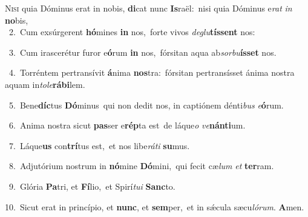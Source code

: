 \lettrine{\initial\textcolor{\initialcolor}{N}}{isi} quia Dóminus erat in nobis, \textbf{di}\-cat nunc \textbf{Is}\-raël:~\star nisi quia Dóminus e\textit{rat} \textit{in} \textbf{no}\-bis,\\
{\numbfont\textcolor{\numbcolor}{~2.}}~Cum exsúrgerent \textbf{hó}\-mines \textbf{in} nos,~\star forte vivos \textit{de}\-\textit{glu}\textbf{tís}\textbf{sent} nos:\par
{\numbfont\textcolor{\numbcolor}{~3.}}~Cum irascerétur furor e\-\textbf{ó}\-rum \textbf{in} nos,~\star fórsitan aqua ab\-\textit{sor}\-\textit{bu}\textbf{ís}\textbf{set} nos.\par
{\numbfont\textcolor{\numbcolor}{~4.}}~Torréntem pertransívit \textbf{á}\-nima \textbf{nos}\-tra:~\star fórsitan pertransísset ánima nostra aquam in\-\textit{to}\-\textit{le}\textbf{rá}\textbf{bi}lem.\par
{\numbfont\textcolor{\numbcolor}{~5.}}~Bene\-\textbf{díc}\-tus \textbf{Dó}\-minus~\star qui non dedit nos, in captiónem dénti\textit{bus} \textit{e}\-\textbf{ó}rum.\par
{\numbfont\textcolor{\numbcolor}{~6.}}~Anima nostra sicut \textbf{pas}\-ser e\-\textbf{rép}\-ta est~\star de láque\textit{o} \textit{ve}\-\textbf{nán}\textbf{ti}um.\par
{\numbfont\textcolor{\numbcolor}{~7.}}~Láque\textbf{us} con\-\textbf{trí}\-tus est,~\star et nos libe\-\textit{rá}\-\textit{ti} \textbf{su}\-mus.\par
{\numbfont\textcolor{\numbcolor}{~8.}}~Adjutórium nostrum in \textbf{nó}\-mine \textbf{Dó}\-mini,~\star qui fecit cæ\textit{lum} \textit{et} \textbf{ter}\-ram.\par
{\numbfont\textcolor{\numbcolor}{~9.}}~Glória \textbf{Pa}\-tri, et \textbf{Fí}\-lio,~\star et Spirí\-\textit{tu}\-\textit{i} \textbf{Sanc}\-to.\par
{\numbfont\textcolor{\numbcolor}{10.}}~Sicut erat in princípio, et \textbf{nunc}\-, et \textbf{sem}\-per,~\star et in sǽcula sæcu\-\textit{ló}\-\textit{rum}. \textbf{A}\-men.\par

